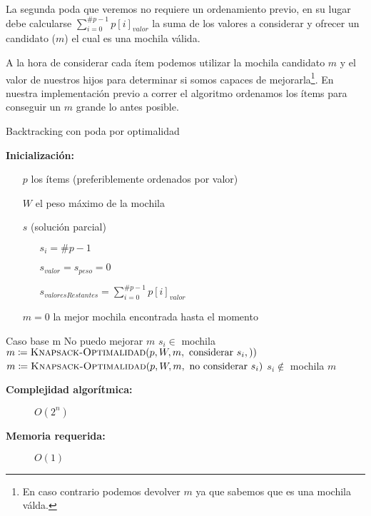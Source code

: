 \documentclass[fleqn, 11pt]{article}
\def\is{\coloneqq}
\begin{document}
La segunda poda que veremos no requiere un ordenamiento previo, en su lugar
debe calcularse $\sum_{i = 0}^{\#p - 1}p[i]_{valor}$ la suma de los valores a
considerar y ofrecer un candidato ($m$) el cual es una mochila válida.

A la hora de considerar cada ítem podemos utilizar la mochila candidato $m$ y
el valor de nuestros hijos para determinar si somos capaces de
mejorarla\footnote{En caso contrario podemos devolver $m$ ya que sabemos que es
una mochila válda.}. En nuestra implementación previo a correr el algoritmo
ordenamos los ítems para conseguir un $m$ grande lo antes posible.

\begin{algorithm}
\caption{Backtracking con poda por optimalidad}
\begin{algorithmic}[1]
\item[\textbf{Inicialización:}]
\item[] \begin{itemize}
	\item[] $p$ los ítems (preferiblemente ordenados por valor)
	\item[] $W$ el peso máximo de la mochila
	\item[] $s$ (solución parcial)
	\begin{itemize}
		\item[] $s_i = \#p - 1$
		\item[] $s_{valor} = s_{peso} = 0$
		\item[] $s_{valoresRestantes} = \sum_{i = 0}^{\#p - 1} p[i]_{valor}$
	\end{itemize}
	\item[] $m = 0$ la mejor mochila encontrada hasta el momento
\end{itemize}
\Statex
{}
	\Comment Caso base
	\State \Return m
\EndIf
{}
	\Comment No puedo mejorar
	\State \Return $m$
\EndIf
{}
	\Comment $s_i \in$ mochila
	\State $m \is \Call{Knapsack-Optimalidad}{p, W, m, \text{ considerar } s_i,)}$
\EndIf
\State $m \is \Call{Knapsack-Optimalidad}{p, W, m, \text{ no considerar } s_i}$
\Comment $s_i \not\in$ mochila
\State \Return $m$
\EndFunction
\end{algorithmic}
\begin{description}
	\item[\textbf{Complejidad algorítmica:}] $O(2^n)$
	\item[\textbf{Memoria requerida:}] $O(1)$
\end{description}
\end{algorithm}
\end{document}

